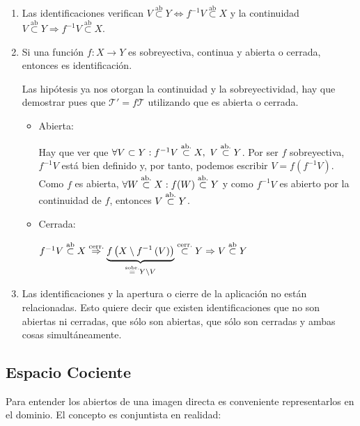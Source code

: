 \begin{obs}
\begin{enumerate}
    \item Las identificaciones verifican $V \stackrel{\text{ab}}{\subset} Y \Leftrightarrow f^{-1}V \stackrel{\text{ab}}{\subset} X$ y la continuidad $V \stackrel{\text{ab}}{\subset } Y \Rightarrow f^{-1}V \stackrel{\text{ab}}{\subset} X$.

	\item Si una función $f: X \rightarrow Y$ es sobreyectiva, continua y abierta o cerrada, entonces es identificación.
	\begin{demo}
	Las hipótesis ya nos otorgan la continuidad y la sobreyectividad, hay que demostrar pues que $\mathcal{T}' = f\mathcal{T}$ utilizando que es abierta o cerrada.
	\begin{itemize}
		\item Abierta:
	
		Hay que ver que $\forall V \subset Y : f^{-1} V \stackrel{\text{ab.}}{\subset} X, \ V \stackrel{\text{ab.}}{\subset} Y$. Por ser $f$ sobreyectiva, $f^{-1}V$ está bien definido y, por tanto, podemos escribir $V=f(f^{-1}V)$. Como $f$ es abierta, $\forall W \stackrel{\text{ab.}}{\subset} X : f(W) \stackrel{\text{ab.}}{\subset} Y$ y como $f^{-1}V$ es abierto por la continuidad de $f$, entonces $V \stackrel{\text{ab.}}{\subset} Y$.
		
		\item Cerrada:
		
		$f^{-1}V \stackrel{\text{ab}}{\subset} X \stackrel{\text{cerr.}}{\Rightarrow} \underbrace{f \left( X \setminus f^{-1}\left( V \right) \right)}_{\stackrel{\text{sobr.}}{=} Y\setminus V}  \stackrel{\text{cerr.}}{\subset} Y \Rightarrow V \stackrel{\text{ab}}{\subset} Y$		
	\end{itemize}
	\end{demo}
	
	 \item Las identificaciones y la apertura o cierre de la aplicación no están relacionadas. Esto quiere decir que existen identificaciones que no son abiertas ni cerradas, que sólo son abiertas, que sólo son cerradas y ambas cosas simultáneamente.
\end{enumerate}
\end{obs}


\subsection{Espacio Cociente}
\label{sub:cocientes}
Para entender los abiertos de una imagen directa es conveniente representarlos en el dominio. El concepto es conjuntista en realidad:

